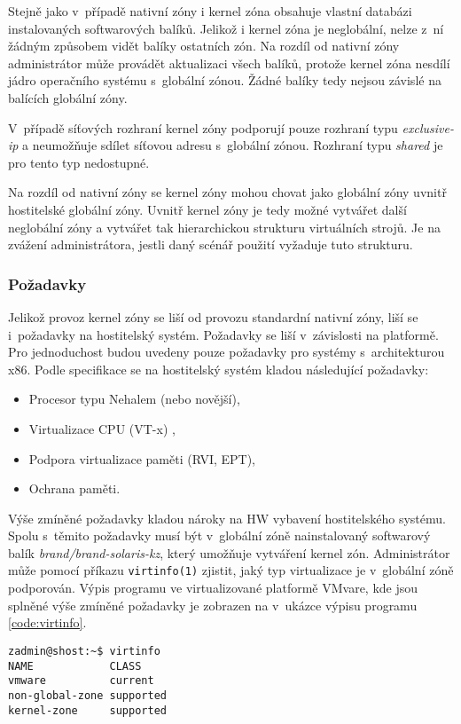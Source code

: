 Stejně jako v~případě nativní zóny i kernel zóna obsahuje vlastní databázi instalovaných softwarových balíků. Jelikož i 
kernel zóna je neglobální, nelze z~ní žádným způsobem vidět balíky ostatních zón. Na rozdíl od nativní zóny administrátor
může provádět aktualizaci všech balíků, protože kernel zóna nesdílí jádro operačního systému s~globální zónou. Žádné balíky
tedy nejsou závislé na balících globální zóny.

V~případě síťových rozhraní kernel zóny podporují pouze rozhraní typu \textit{exclusive-ip} a neumožňuje sdílet síťovou adresu
s~globální zónou. Rozhraní typu \textit{shared} je pro tento typ nedostupné.

Na rozdíl od nativní zóny se kernel zóny mohou chovat jako globální zóny uvnitř hostitelské globální zóny.
Uvnitř kernel zóny je tedy možné vytvářet další neglobální zóny a vytvářet tak hierarchickou strukturu virtuálních strojů. Je
na zvážení administrátora, jestli daný scénář použití vyžaduje tuto strukturu.
\subsubsection*{Požadavky}
\label{chapter:zones:types:kernel:demands}
Jelikož provoz kernel zóny se liší od provozu standardní nativní zóny, liší se i~požadavky na hostitelský systém. Požadavky
se liší v~závislosti na platformě. Pro jednoduchost budou uvedeny pouze požadavky pro systémy s~architekturou x86. Podle specifikace
\cite{oracle:solaris:zones:kernel_zones_requiremets} se na hostitelský systém kladou následující požadavky:
\begin{itemize}
 \item Procesor typu Nehalem (nebo novější),
 \item Virtualizace CPU (VT-x) ,
 \item Podpora virtualizace paměti (RVI, EPT),
 \item Ochrana paměti.
\end{itemize}
Výše zmíněné požadavky kladou nároky na HW vybavení hostitelského systému. Spolu s~těmito požadavky musí být v~globální zóně
nainstalovaný softwarový balík \textit{brand/brand-solaris-kz}, který umožňuje vytváření kernel zón. Administrátor může pomocí příkazu
\verb|virtinfo(1)| zjistit, jaký typ virtualizace je v~globální zóně podporován. Výpis programu ve virtualizované platformě
VMvare, kde jsou splněné výše zmíněné požadavky je zobrazen na v~ukázce výpisu programu \ref{code:virtinfo}.
\begin{lstlisting}[caption={Výpis příkazu virtinfo}, label={code:virtinfo}]  
zadmin@shost:~$ virtinfo
NAME            CLASS     
vmware          current   
non-global-zone supported
kernel-zone     supported
\end{lstlisting}

